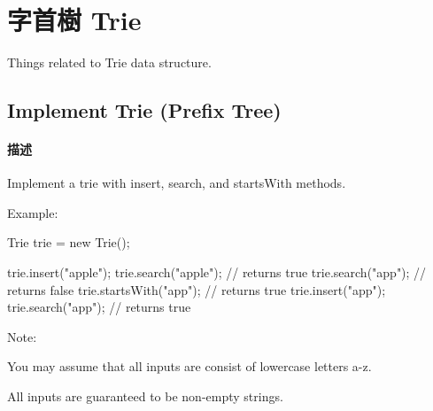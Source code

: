 \chapter{字首樹 Trie}
Things related to Trie data structure.
\newline

\section{Implement Trie (Prefix Tree)} %
\label{sec:implement-trie}


\subsubsection{描述}
Implement a trie with insert, search, and startsWith methods.

Example:
\begin{Code}
Trie trie = new Trie();

trie.insert("apple");
trie.search("apple");   // returns true
trie.search("app");     // returns false
trie.startsWith("app"); // returns true
trie.insert("app");   
trie.search("app");     // returns true
\end{Code}

Note:
\begindot
\item You may assume that all inputs are consist of lowercase letters a-z.
\item All inputs are guaranteed to be non-empty strings.
\myenddot


